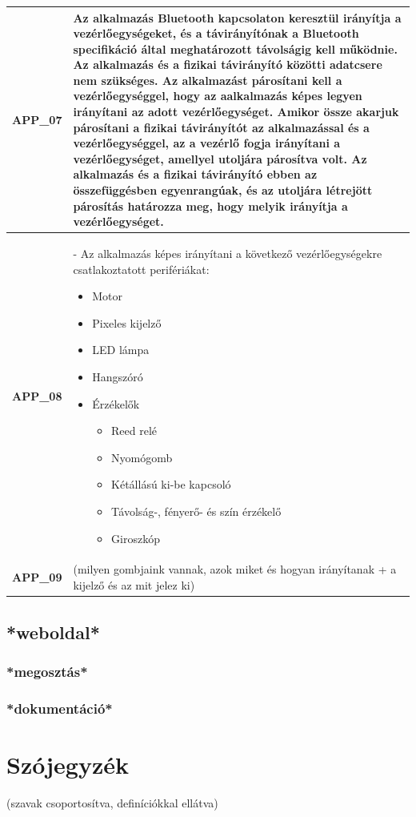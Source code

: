 \documentclass{article}
\begin{document}
\begin{longtable}{|c|p{14cm}|}
       \textbf{APP\_07}  & Az alkalmazás Bluetooth kapcsolaton keresztül irányítja a vezérlőegységeket, és a távirányítónak a Bluetooth specifikáció által meghatározott távolságig kell működnie. Az alkalmazás és a fizikai távirányító közötti adatcsere nem szükséges. Az alkalmazást párosítani kell a vezérlőegységgel, hogy az aalkalmazás képes legyen irányítani az adott vezérlőegységet. Amikor össze akarjuk párosítani a fizikai távirányítót az alkalmazással és a vezérlőegységgel, az a vezérlő fogja irányítani a vezérlőegységet, amellyel utoljára párosítva volt. Az alkalmazás és a fizikai távirányító ebben az összefüggésben egyenrangúak, és az utoljára létrejött párosítás határozza meg, hogy melyik irányítja a vezérlőegységet. \\\hline
       
       \textbf{APP\_08}  & - Az alkalmazás képes irányítani a következő vezérlőegységekre csatlakoztatott perifériákat:
       \begin{itemize}
       \item Motor
       \item Pixeles kijelző
       \item LED lámpa
       \item Hangszóró
       \item Érzékelők
         \begin{itemize}
         \item Reed relé
         \item Nyomógomb
         \item Kétállású ki-be kapcsoló
         \item Távolság-, fényerő- és szín érzékelő
         \item Giroszkóp
         \end{itemize}
       \end{itemize} \\\hline

       \textbf{APP\_09}  & (milyen gombjaink vannak, azok miket és hogyan irányítanak + a kijelző és az mit jelez ki) \\\hline
       
\hline
\end{longtable}
\endgroup


\subsection{*weboldal*}
\subsubsection{*megosztás*}
\subsubsection{*dokumentáció*}


\pagebreak
\section{Szójegyzék}

(szavak csoportosítva, definíciókkal ellátva)
\end{document}
